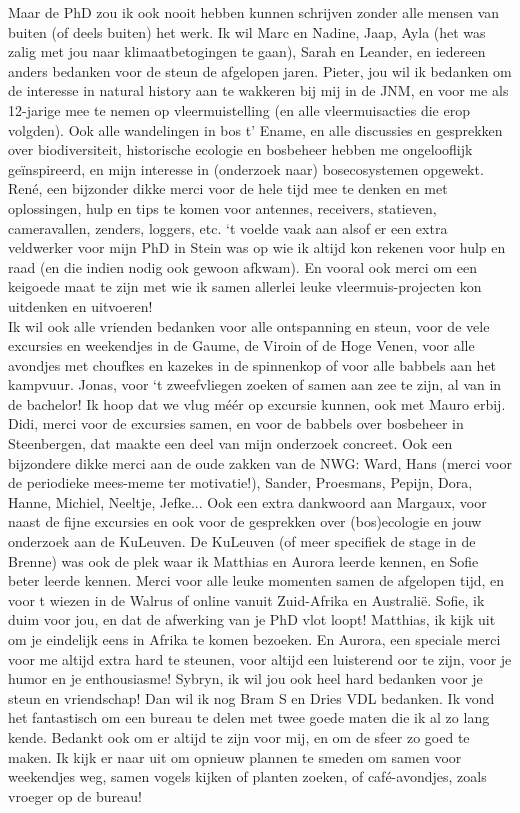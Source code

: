 \documentclass[10pt, twoside]{book} %
\begin{document}
Maar de PhD zou ik ook nooit hebben kunnen schrijven zonder alle mensen van buiten (of deels buiten) het werk. Ik wil Marc en Nadine, Jaap, Ayla (het was zalig met jou naar klimaatbetogingen te gaan), Sarah en Leander, en iedereen anders bedanken voor de steun de afgelopen jaren. Pieter, jou wil ik bedanken om de interesse in natural history aan te wakkeren bij mij in de JNM, en voor me als 12-jarige mee te nemen op vleermuistelling (en alle vleermuisacties die erop volgden). Ook alle wandelingen in bos t' Ename, en alle discussies en gesprekken over biodiversiteit, historische ecologie en bosbeheer hebben me ongelooflijk ge\"{i}nspireerd, en mijn interesse in (onderzoek naar) bosecosystemen opgewekt. Ren\'{e}, een bijzonder dikke merci voor de hele tijd mee te denken en met oplossingen, hulp en tips te komen voor antennes, receivers, statieven, cameravallen, zenders, loggers, etc. `t voelde vaak aan alsof er een extra veldwerker voor mijn PhD in Stein was op wie ik altijd kon rekenen voor hulp en raad (en die indien nodig ook gewoon afkwam). En vooral ook merci om een keigoede maat te zijn met wie ik samen allerlei leuke vleermuis-projecten kon uitdenken en uitvoeren!\\

Ik wil ook alle vrienden bedanken voor alle ontspanning en steun, voor de vele excursies en weekendjes in de Gaume, de Viroin of de Hoge Venen, voor alle avondjes met choufkes en kazekes in de spinnenkop of voor alle babbels aan het kampvuur. Jonas, voor `t zweefvliegen zoeken of samen aan zee te zijn, al van in de bachelor! Ik hoop dat we vlug m\'{e}\'{e}r op excursie kunnen, ook met Mauro erbij. Didi, merci voor de excursies samen, en voor de babbels over bosbeheer in Steenbergen, dat maakte een deel van mijn onderzoek concreet. Ook een bijzondere dikke merci aan de oude zakken van de NWG: Ward, Hans (merci voor de periodieke mees-meme ter motivatie!), Sander, Proesmans, Pepijn, Dora, Hanne, Michiel, Neeltje, Jefke... Ook een extra dankwoord aan Margaux, voor naast de fijne excursies en ook voor de gesprekken over (bos)ecologie en jouw onderzoek aan de KuLeuven. De KuLeuven (of meer specifiek de stage in de Brenne) was ook de plek waar ik Matthias en Aurora leerde kennen, en Sofie beter leerde kennen. Merci voor alle leuke momenten samen de afgelopen tijd, en voor t wiezen in de Walrus of online vanuit Zuid-Afrika en Australi\"{e}. Sofie, ik duim voor jou, en dat de afwerking van je PhD vlot loopt! Matthias, ik kijk uit om je eindelijk eens in Afrika te komen bezoeken. En Aurora, een speciale merci voor me altijd extra hard te steunen, voor altijd een luisterend oor te zijn, voor je humor en je enthousiasme! Sybryn, ik wil jou ook heel hard bedanken voor je steun en vriendschap! Dan wil ik nog Bram S en Dries VDL bedanken. Ik vond het fantastisch om een bureau te delen met twee goede maten die ik al zo lang kende. Bedankt ook om er altijd te zijn voor mij, en om de sfeer zo goed te maken. Ik kijk er naar uit om opnieuw plannen te smeden om samen voor weekendjes weg, samen vogels kijken of planten zoeken, of caf\'{e}-avondjes, zoals vroeger op de bureau!\\
\end{document}
